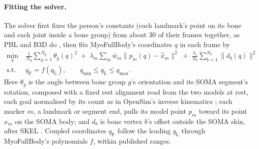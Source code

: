 \documentclass[11pt]{article}
\begin{document}
\paragraph{Fitting the solver.} The solver first fixes the person's constants (each landmark's point on its bone and
each joint inside a bone group) from about 30 of their frames together, as PBL and B3D do
\cite{peiffer2025pbl,cotton2026b3d}, then fits MyoFullBody's coordinates $q$ in each frame by
\begin{equation}
\begin{aligned}
\min_{q}\;& \frac{1}{N_g}\sum_{g=1}^{N_g} \theta_g(q)^2
 \;+\; \lambda_m \sum_{m} \bar w_m \bigl\lVert p_m(q) - \hat x_m \bigr\rVert^2
 \;+\; \frac{\lambda_s}{N_b}\sum_{b=1}^{N_b} \bigl\lVert d_b(q) \bigr\rVert^2 \\
\text{s.t.}\;& q_{\mathrm{F}} = f(q_{\mathrm{L}}), \qquad q_{\min} \le q_{\mathrm{L}} \le q_{\max}.
\end{aligned}
\label{eq:fit}
\end{equation}
Here $\theta_g$ is the angle between bone group $g$'s orientation and its SOMA segment's rotation, composed with a
fixed rest alignment read from the two models at rest, each goal normalised by its count as in OpenSim's inverse
kinematics \cite{seth2018opensim}; each marker $m$, a landmark or segment end, pulls its model point $p_m$ toward its
point $\hat x_m$ on the SOMA body; and $d_b$ is bone vertex $b$'s offset outside the SOMA skin, after SKEL
\cite{keller2023skel}. Coupled coordinates $q_{\mathrm{F}}$ follow the leading $q_{\mathrm{L}}$ through MyoFullBody's
polynomials $f$, within published ranges.
\end{document}
